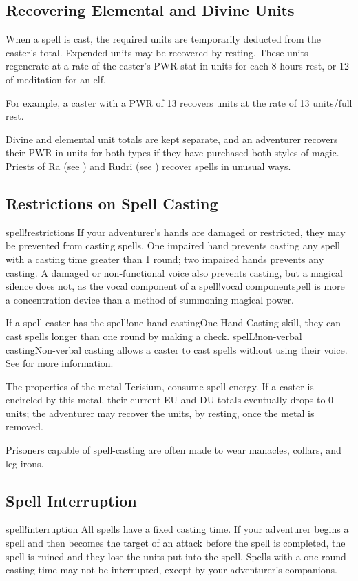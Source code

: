 \subsection{Recovering Elemental and Divine Units}
When a spell is cast, the required units are temporarily deducted from the caster's total. Expended units may be recovered by resting. These units regenerate at a rate of the caster's PWR stat in units for each 8 hours rest, or 12 of meditation for an elf.

For example, a caster with a PWR of 13 recovers units at the rate of 13 units/full rest. 

Divine and elemental unit totals are kept separate, and an adventurer recovers their PWR in units for both types if they have purchased both styles of magic. Priests of Ra (see ) and Rudri (see ) recover spells in unusual ways.
\subsection{Restrictions on Spell Casting}
spell!restrictions
If your adventurer's hands are damaged or restricted, they may be prevented from casting spells. One impaired hand prevents casting any spell with a casting time greater than 1 round; two impaired hands prevents any casting. A damaged or non-functional voice also prevents casting, but a magical silence does not, as the vocal component of a spell!vocal componentspell is more a concentration device than a method of summoning magical power. 

If a spell caster has the spell!one-hand castingOne-Hand Casting skill, they can cast spells longer than one round by making a check. spelL!non-verbal castingNon-verbal casting allows a caster to cast spells without using their voice. See  for more information.

The properties of the metal Terisium, consume spell energy. If a caster is encircled by this metal, their current EU and DU totals eventually drops to 0 units; the adventurer may recover the units, by resting, once the metal is removed. 

Prisoners capable of spell-casting are often made to wear manacles, collars, and leg irons.
\subsection{Spell Interruption}
spell!interruption
All spells have a fixed casting time. If your adventurer begins a spell and then becomes the target of an attack before the spell is completed, the spell is ruined and they lose the units put into the spell. Spells with a one round casting time may not be interrupted, except by your adventurer's companions. 

